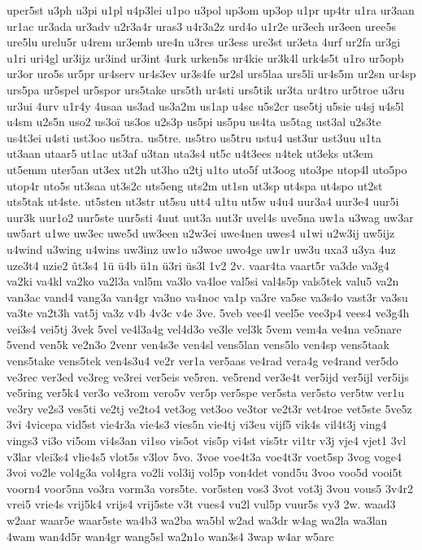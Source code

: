 {uper5st
u3ph
u3pi
u1pl
u4p3lei
u1po
u3pol
up3om
up3op
u1pr
up4tr
u1ra
ur3aan
ur1ac
ur3ada
ur3adv
u2r3a4r
uras3
u4r3a2z
urd4o
u1r2e
ur3ech
ur3een
uree5s
ure5lu
urelu5r
u4rem
ur3emb
ure4n
u3res
ur3ess
ure3st
ur3eta
4urf
ur2fa
ur3gi
u1ri
uri4gl
ur3ijz
ur3ind
ur3int
4urk
urken5s
ur4kie
ur3k4l
urk4s5t
u1ro
ur5opb
ur3or
uro5s
ur5pr
ur4serv
ur4s3ev
ur3s4fe
ur2sl
urs5laa
urs5li
ur4s5m
ur2sn
ur4sp
urs5pa
ur5spel
ur5spor
urs5take
urs5th
ur4sti
urs5tik
ur3ta
ur4tro
ur5troe
u3ru
ur3ui
4urv
u1r4y
4usaa
us3ad
us3a2m
us1ap
u4sc
u5s2cr
use5tj
u5sie
u4sj
u4s5l
u4sm
u2s5n
uso2
us3oï
us3os
u2s3p
us5pi
us5pu
us4ta
us5tag
ust3al
u2s3te
us4t3ei
u4sti
ust3oo
us5tra.
us5tre.
us5tro
us5tru
ustu4
ust3ur
ust3uu
u1ta
ut3aan
utaar5
ut1ac
ut3af
u3tan
uta3s4
ut5c
u4t3ees
u4tek
ut3eks
ut3em
ut5emm
uter5an
ut3ex
ut2h
ut3ho
u2tj
u1to
uto5f
ut3oog
uto3pe
utop4l
uto5po
utop4r
uto5s
ut3saa
ut3s2c
uts5eng
uts2m
ut1sn
ut3sp
ut4spa
ut4spo
ut2st
uts5tak
ut4ste.
ut5sten
ut3str
ut5su
utt4
u1tu
ut5w
u4u4
uur3a4
uur3e4
uur5i
uur3k
uur1o2
uur5ste
uur5sti
4uut
uut3a
uut3r
uvel4s
uve5na
uw1a
u3wag
uw3ar
uw5art
u1we
uw3ec
uwe5d
uw3een
u2w3ei
uwe4nen
uwes4
u1wi
u2w3ij
uw5ijz
u4wind
u3wing
u4wins
uw3inz
uw1o
u3woe
uwo4ge
uw1r
uw3u
uxa3
u3ya
4uz
uze3t4
uzie2
ût3s4
1ü
ü4b
ü1n
ü3ri
üs3l
1v2
2v.
vaar4ta
vaart5r
va3de
va3g4
va2ki
va4kl
va2ko
va2l3a
val5m
va3lo
va4loe
val5si
val4s5p
vals5tek
valu5
va2n
van3ac
vand4
vang3a
van4gr
va3no
va4noc
va1p
va3re
va5se
va3s4o
vast3r
va3su
va3te
va2t3h
vat5j
va3z
v4b
4v3c
v4e
3ve.
5veb
vee4l
veel5e
vee3p4
vees4
ve3g4h
vei3s4
vei5tj
3vek
5vel
ve4l3a4g
vel4d3o
ve3le
vel3k
5vem
vem4a
ve4na
ve5nare
5vend
ven5k
ve2n3o
2venr
ven4s3e
ven4sl
vens5lan
vens5lo
ven4sp
vens5taak
vens5take
vens5tek
ven4s3u4
ve2r
ver1a
ver5aas
ve4rad
vera4g
ve4rand
ver5do
ve3rec
ver3ed
ve3reg
ve3rei
ver5eis
ve5ren.
ve5rend
ver3e4t
ver5ijd
ver5ijl
ver5ijs
ve5ring
ver5k4
ver3o
ve3rom
vero5v
ver5p
ver5spe
ver5sta
ver5sto
ver5tw
ver1u
ve3ry
ve2s3
ves5ti
ve2tj
ve2to4
vet3og
vet3oo
ve3tor
ve2t3r
vet4roe
vet5ste
5ve5z
3vi
4vicepa
vid5st
vie4r3a
vie4s3
vies5n
vie4tj
vi3eu
vijf5
vik4s
vil4t3j
ving4
vings3
vi3o
vi5om
vi4s3an
vi1so
vis5ot
vis5p
vi4st
vis5tr
vi1tr
v3j
vje4
vjet1
3vl
v3lar
vlei3s4
vlie4s5
vlot5s
v3lov
5vo.
3voe
voe4t3a
voe4t3r
voet5sp
3vog
voge4
3voi
vo2le
vol4g3a
vol4gra
vo2li
vol3ij
vol5p
von4det
vond5u
3voo
voo5d
vooi5t
voorn4
voor5na
vo3ra
vorm3a
vors5te.
vor5sten
vos3
3vot
vot3j
3vou
vous5
3v4r2
vrei5
vrie4s
vrij5k4
vrijs4
vrij5ste
v3t
vues4
vu2l
vul5p
vuur5s
vy3
2w.
waad3
w2aar
waar5e
waar5ste
wa4b3
wa2ba
wa5bl
w2ad
wa3dr
w4ag
wa2la
wa3lan
4wam
wan4d5r
wan4gr
wang5sl
wa2n1o
wan3s4
3wap
w4ar
w5arc
}
